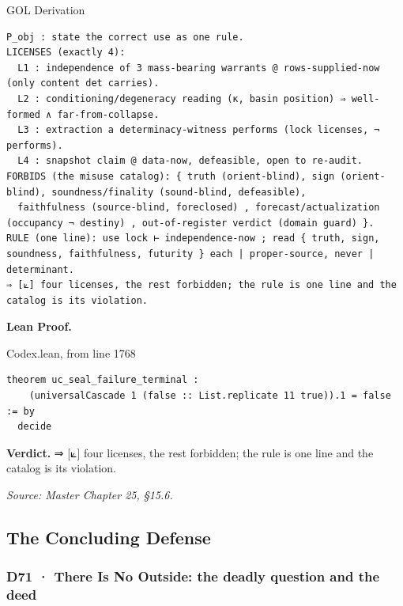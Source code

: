\documentclass[10pt,twocolumn]{article}
\begin{document}
\begin{golbox}{GOL Derivation}
\begin{lstlisting}[style=golv]
P_obj : state the correct use as one rule.
LICENSES (exactly 4):
  L1 : independence of 3 mass-bearing warrants @ rows-supplied-now (only content det carries).
  L2 : conditioning/degeneracy reading (κ, basin position) ⇒ well-formed ∧ far-from-collapse.
  L3 : extraction a determinacy-witness performs (lock licenses, ¬ performs).
  L4 : snapshot claim @ data-now, defeasible, open to re-audit.
FORBIDS (the misuse catalog): { truth (orient-blind), sign (orient-blind), soundness/finality (sound-blind, defeasible),
  faithfulness (source-blind, foreclosed) , forecast/actualization (occupancy ¬ destiny) , out-of-register verdict (domain guard) }.
RULE (one line): use lock ⊢ independence-now ; read { truth, sign, soundness, faithfulness, futurity } each | proper-source, never | determinant.
⇒ [⟀] four licenses, the rest forbidden; the rule is one line and the catalog is its violation.
\end{lstlisting}
\end{golbox}

\textbf{Lean Proof.}

\begin{leanexcerpt}{Codex.lean, from line 1768}
\begin{lstlisting}[style=leanx,firstnumber=1768]
theorem uc_seal_failure_terminal :
    (universalCascade 1 (false :: List.replicate 11 true)).1 = false := by
  decide
\end{lstlisting}
\end{leanexcerpt}

\textbf{Verdict.} ⇒ {[}⟀{]} four licenses, the rest forbidden; the rule
is one line and the catalog is its violation.

\emph{Source: Master Chapter 25, §15.6.}

\hypertarget{the-concluding-defense}{%
\subsection{The Concluding Defense}\label{the-concluding-defense}}

\hypertarget{d71-there-is-no-outside-the-deadly-question-and-the-deed}{%
\subsubsection{D71 · There Is No Outside: the deadly question and the
deed}\label{d71-there-is-no-outside-the-deadly-question-and-the-deed}}
\end{document}
